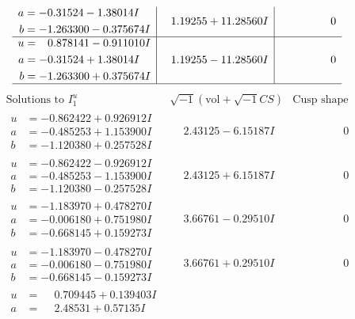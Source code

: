 \documentclass[1p]{elsarticle_modified}
\theoremstyle{definition}
\newcommand{\I}{\sqrt{-1}}
\begin{document}
$$\begin{array}{c|c|c}
\begin{aligned}
a &= -0.31524 - 1.38014 I \\
b &= -1.263300 - 0.375674 I\end{aligned}
 & \phantom{-}1.19255 + 11.28560 I & \phantom{-0.000000 } 0 \\ \hline\begin{aligned}
u &= \phantom{-}0.878141 - 0.911010 I \\
a &= -0.31524 + 1.38014 I \\
b &= -1.263300 + 0.375674 I\end{aligned}
 & \phantom{-}1.19255 - 11.28560 I & \phantom{-0.000000 } 0\\
 \hline 
 \end{array}$$\newpage$$\begin{array}{c|c|c}  
\text{Solutions to }I^u_{1}& \I (\text{vol} + \sqrt{-1}CS) & \text{Cusp shape}\\
 \hline 
\begin{aligned}
u &= -0.862422 + 0.926912 I \\
a &= -0.485253 + 1.153900 I \\
b &= -1.120380 + 0.257528 I\end{aligned}
 & \phantom{-}2.43125 - 6.15187 I & \phantom{-0.000000 } 0 \\ \hline\begin{aligned}
u &= -0.862422 - 0.926912 I \\
a &= -0.485253 - 1.153900 I \\
b &= -1.120380 - 0.257528 I\end{aligned}
 & \phantom{-}2.43125 + 6.15187 I & \phantom{-0.000000 } 0 \\ \hline\begin{aligned}
u &= -1.183970 + 0.478270 I \\
a &= -0.006180 + 0.751980 I \\
b &= -0.668145 + 0.159273 I\end{aligned}
 & \phantom{-}3.66761 - 0.29510 I & \phantom{-0.000000 } 0 \\ \hline\begin{aligned}
u &= -1.183970 - 0.478270 I \\
a &= -0.006180 - 0.751980 I \\
b &= -0.668145 - 0.159273 I\end{aligned}
 & \phantom{-}3.66761 + 0.29510 I & \phantom{-0.000000 } 0 \\ \hline\begin{aligned}
u &= \phantom{-}0.709445 + 0.139403 I \\
a &= \phantom{-}2.48531 + 0.57135 I \\

\end{aligned}
\end{array}$$
\end{document}
